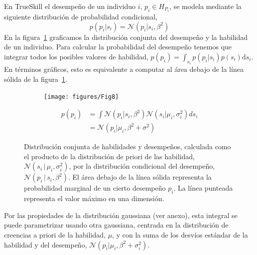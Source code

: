 \documentclass[a4paper,11pt]{book}
\newcommand{\N}{\mathcal{N}}
\theoremstyle{definition}
\begin{document}

En TrueSkill el desempe\~no de un individuo $i$, $p_i \in H_{P_i}$, se modela mediante la siguiente distribuci\'on de probabilidad condicional,
%
\begin{equation}
p(p_i|s_i) = \N(p_i | s_i, \beta^2)
\end{equation}
%
En la figura~\ref{paso_1_multiplicacion_normales} graficamos la distribuci\'on conjunta del desempe\~no y la habilidad de un individuo.
%
Para calcular la probabilidad del desempe\~no tenemos que integrar todos los posibles valores de habilidad, $p(p_i) = \int_{s_i} p(p_i|s_i)p(s_i) \text{d}s_i $.
%
En t\'erminos gr\'aficos, esto es equivalente a computar al \'area debajo de la l\'inea s\'olida de la figura~\ref{paso_1_multiplicacion_normales}.
%
\begin{figure}[ht!]
\centering
\begin{subfigure}[c]{0.4\textwidth}
\centering
\texttt{[image: figures/Fig8]}
\end{subfigure}
\begin{subfigure}[c]{0.5\textwidth}
\begin{align*}\label{p.p_i}
p(p_i) & = \int \N(p_i | s_i, \beta^2) \N(s_i | \mu_i,\sigma_i^2) ds_i  \\
&= \N(p_i|\mu_i, \beta^2 + \sigma^2)
\end{align*}
\end{subfigure}
\caption{Distribuci\'on conjunta de habilidades y desempe\~nos, calculada como el producto de la distribuci\'on de priori de las habilidad, $\N(s_i \, | \, \mu_i, \sigma_i^2)$, por la distribuci\'on condicional del desempe\~no, $\N(p_i \, | \, s_i, \beta^2)$.
%
El \'area debajo de la l\'inea s\'olida representa la probabilidad marginal de un cierto desempe\~no $p_i$.
%
La l\'inea punteada representa el valor m\'aximo en una dimensi\'on.
}
\label{paso_1_multiplicacion_normales}
\end{figure}
%
Por las propiedades de la distribuci\'on gaussiana (ver anexo), esta integral se puede parametrizar usando otra gaussiana, centrada en la distribuci\'on de creencias a priori de la habilidad, $\mu$, y con la suma de los desv\'ios est\'andar de la habilidad y del desempe\~no, $\N(p_i | \mu_i, \beta^2 +\sigma_i^2)$.

\end{document}
